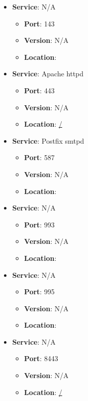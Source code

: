 \documentclass{article}
\begin{document}
\begin{itemize}
        \item \textbf{Service}: N/A
        \begin{itemize}
            \item \textbf{Port}: 143
            \item \textbf{Version}:  N/A 
            \item \textbf{Location}: \href{  }{  }
        \end{itemize}
    
        \item \textbf{Service}: Apache httpd
        \begin{itemize}
            \item \textbf{Port}: 443
            \item \textbf{Version}:  N/A 
            \item \textbf{Location}: \href{ / }{ / }
        \end{itemize}
    
        \item \textbf{Service}: Postfix smtpd
        \begin{itemize}
            \item \textbf{Port}: 587
            \item \textbf{Version}:  N/A 
            \item \textbf{Location}: \href{  }{  }
        \end{itemize}
    
        \item \textbf{Service}: N/A
        \begin{itemize}
            \item \textbf{Port}: 993
            \item \textbf{Version}:  N/A 
            \item \textbf{Location}: \href{  }{  }
        \end{itemize}
    
        \item \textbf{Service}: N/A
        \begin{itemize}
            \item \textbf{Port}: 995
            \item \textbf{Version}:  N/A 
            \item \textbf{Location}: \href{  }{  }
        \end{itemize}
    
        \item \textbf{Service}: N/A
        \begin{itemize}
            \item \textbf{Port}: 8443
            \item \textbf{Version}:  N/A 
            \item \textbf{Location}: \href{ / }{ / }
        \end{itemize}
    

\end{itemize}
\end{document}
